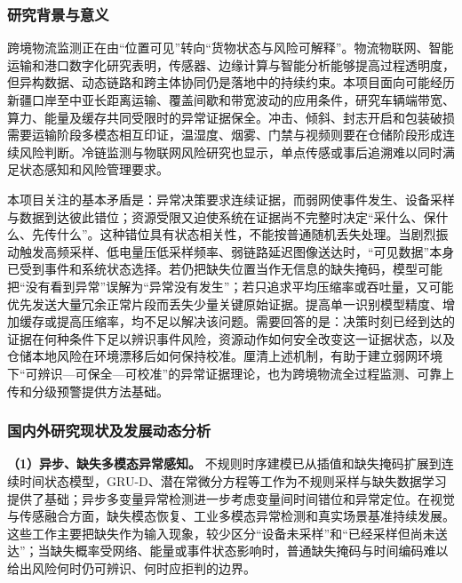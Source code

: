 \justifying
\NSFCBodyText

\subsubsection{研究背景与意义}

跨境物流监测正在由“位置可见”转向“货物状态与风险可解释”。物流物联网、智能运输和港口数字化研究表明，传感器、边缘计算与智能分析能够提高过程透明度，但异构数据、动态链路和跨主体协同仍是落地中的持续约束\cite{golpira2021liot,rejeb2020iotlogistics,chung2021smartlogistics,digitaltwinsfor2023}。本项目面向可能经历新疆口岸至中亚长距离运输、覆盖间歇和带宽波动的应用条件，研究车辆端带宽、算力、能量及缓存共同受限时的异常证据保全。冲击、倾斜、封志开启和包装破损需要运输阶段多模态相互印证，温湿度、烟雾、门禁与视频则要在仓储阶段形成连续风险判断。冷链监测与物联网风险研究也显示，单点传感或事后追溯难以同时满足状态感知和风险管理要求\cite{badiamelis2018coldchain,tsang2018iotrisk}。

本项目关注的基本矛盾是：异常决策要求连续证据，而弱网使事件发生、设备采样与数据到达彼此错位；资源受限又迫使系统在证据尚不完整时决定“采什么、保什么、先传什么”。这种错位具有状态相关性，不能按普通随机丢失处理。当剧烈振动触发高频采样、低电量压低采样频率、弱链路延迟图像送达时，“可见数据”本身已受到事件和系统状态选择。若仍把缺失位置当作无信息的缺失掩码，模型可能把“没有看到异常”误解为“异常没有发生”；若只追求平均压缩率或吞吐量，又可能优先发送大量冗余正常片段而丢失少量关键原始证据。提高单一识别模型精度、增加缓存或提高压缩率，均不足以解决该问题。需要回答的是：决策时刻已经到达的证据在何种条件下足以辨识事件风险，资源动作如何安全改变这一证据状态，以及仓储本地风险在环境漂移后如何保持校准。厘清上述机制，有助于建立弱网环境下“可辨识—可保全—可校准”的异常证据理论，也为跨境物流全过程监测、可靠上传和分级预警提供方法基础。

\subsubsection{国内外研究现状及发展动态分析}

\textbf{（1）异步、缺失多模态异常感知。} 不规则时序建模已从插值和缺失掩码扩展到连续时间状态模型，GRU-D、潜在常微分方程等工作为不规则采样与缺失数据学习提供了基础\cite{che2018grud,rubanova2019latentode}；异步多变量异常检测进一步考虑变量间时间错位和异常定位\cite{practicalapproachto2021,aaadasynchronousinter2025,tuli2022tranad}。在视觉与传感融合方面，缺失模态恢复、工业多模态异常检测和真实场景基准持续发展\cite{distributionconsistentmodal2023,mfganmultimodalfusion2024,m3dmnrrgb2024,robustada2025,realiadd32025}。这些工作主要把缺失作为输入现象，较少区分“设备未采样”和“已经采样但尚未送达”；当缺失概率受网络、能量或事件状态影响时，普通缺失掩码与时间编码难以给出风险何时仍可辨识、何时应拒判的边界。

